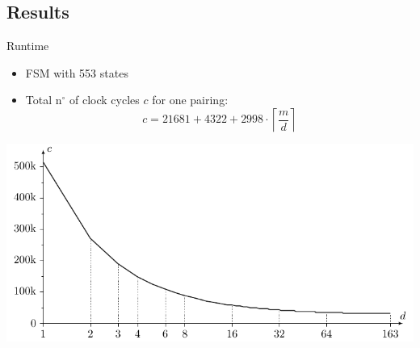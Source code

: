 \documentclass[svgnames]{beamer}
\newenvironment{changemargin}[2]{%
\begin{list}{}{%
\setlength{\topsep}{0pt}%
\setlength{\leftmargin}{#1}%
\setlength{\rightmargin}{#2}%
\setlength{\listparindent}{\parindent}%
\setlength{\itemindent}{\parindent}%
\setlength{\parsep}{\parskip}%
}%
\item[]}{\end{list}}
\begin{document}
\subsection*{Results}
\begin{frame}{Runtime}
	\begin{itemize}
		\item FSM with 553 states
		\item Total n$^{\circ}$ of clock cycles $c$ for one pairing:
				\[c = 21681 + 4322 + 2998 \cdot \left\lceil \frac{m}{d} \right\rceil\]
	\end{itemize}
	
	\begin{changemargin}{-4cm}{-4cm}
		\begin{center}\includegraphics[height=0.40\paperheight]{images/results-multi-cycles}\end{center}
	\end{changemargin}
	
	~\\[3em]
	
\vfill
\end{frame}
\end{document}
